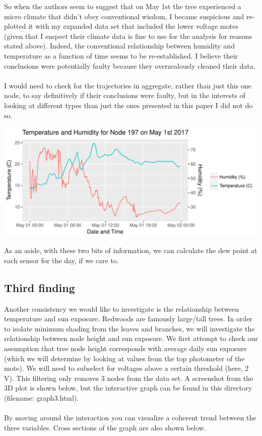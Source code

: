 \documentclass[english]{article}\usepackage[]{graphicx}\usepackage[]{color}
\makeatletter
\def\maxwidth{ %
  \ifdim\Gin@nat@width>\linewidth
    \linewidth
  \else
    \Gin@nat@width
  \fi
}
\newenvironment{knitrout}{}{} %
\makeatother
\begin{document}
So when the authors seem to suggest that on May 1st the tree experienced a micro climate
that didn't obey conventional wisdom, I became suspicious and re-plotted it with my expanded
data set that included the lower voltage motes (given that I suspect their climate data is
fine to use for the analysis for reasons stated above).  Indeed, the conventional relationship
between humidity and temperature as a function of time seems to be re-established.  I believe
their conclusions were potentially faulty because they overzealously cleaned their data.\\\\
I would need to check for the trajectories in aggregate, rather than just this one node, to say
definitively if their conclusions were faulty, but in the interests of looking at different types
than just the ones presented in this paper I did not do so.

\begin{knitrout}
\color{fgcolor}

{\centering \includegraphics[width=\maxwidth]{figure/q2_2-1} 

}



\end{knitrout}

As an aside, with these two bits of information, we can calculate the dew point at
each sensor for the day, if we care to.

\subsection{Third finding}

Another consistency we would like to investigate is the relationship between temperature and sun exposure.
Redwoods are famously large/tall trees.  In order to isolate minimum shading from the leaves and branches, 
we will investigate the relationship between node height and sun exposure.  We first attempt to check our
assumption that tree node height corresponds with average daily sun exposure (which we will determine by
looking at values from the top photometer of the mote).  We will need to subselect for voltages above a 
certain threshold (here, 2 V).  This filtering only removes 3 nodes from the data set.  A screenshot from the
3D plot is shown below, but the interactive graph can be found in this directory (filename: graph3.html).\\\\
By moving around the interaction you can visualize a coherent trend between the three variables.
Cross sections of the graph are also shown below.
\end{document}
